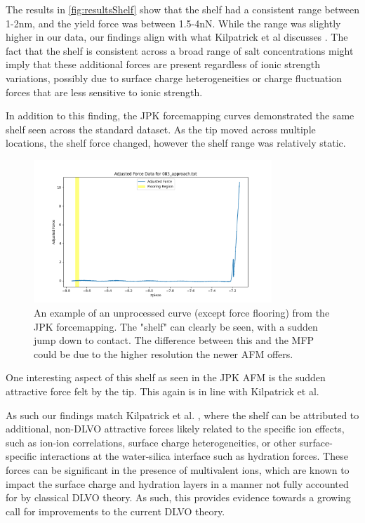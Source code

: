 The results in \ref{fig:resultsShelf} show that the shelf had a consistent range between 1-2nm, and the yield force was between 1.5-4nN. While the range was slightly higher in our data, our findings align with what Kilpatrick et al discusses \cite{Kilpatrick2013DirectlyProbing}. The fact that the shelf is consistent across a broad range of salt concentrations might imply that these additional forces are present regardless of ionic strength variations, possibly due to surface charge heterogeneities or charge fluctuation forces that are less sensitive to ionic strength.

In addition to this finding, the JPK forcemapping curves demonstrated the same shelf seen across the standard dataset. As the tip moved across multiple locations, the shelf force changed, however the shelf range was relatively static.

\begin{figure}[h!!]
\centering
\includegraphics[width=0.8\textwidth]{chapter8/Shelf/083_approach.png}
\caption{An example of an unprocessed curve (except force flooring) from the JPK forcemapping. The "shelf" can clearly be seen, with a sudden jump down to contact. The difference between this and the MFP could be due to the higher resolution the newer AFM offers.}
\label{fig:noisey}
\end{figure}

One interesting aspect of this shelf as seen in the JPK AFM is the sudden attractive force felt by the tip. This again is in line with Kilpatrick et al.

As such our findings match Kilpatrick et al. \cite{Kilpatrick2013DirectlyProbing}, where the shelf can be attributed to additional, non-DLVO attractive forces likely related to the specific ion effects, such as ion-ion correlations, surface charge heterogeneities, or other surface-specific interactions at the water-silica interface such as hydration forces. These forces can be significant in the presence of multivalent ions, which are known to impact the surface charge and hydration layers in a manner not fully accounted for by classical DLVO theory. As such, this provides evidence towards a growing call for improvements to the current DLVO theory.

